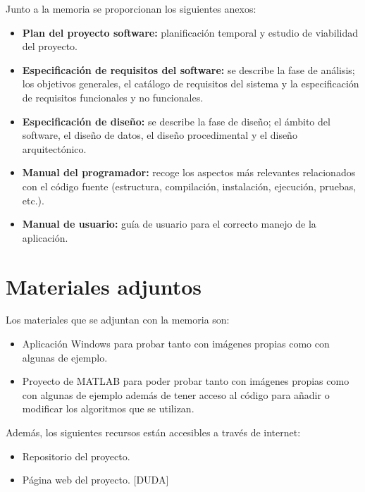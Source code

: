 Junto a la memoria se proporcionan los siguientes anexos:

\begin{itemize}
    \tightlist
        \item
            \textbf{Plan del proyecto software:} planificación temporal y estudio de viabilidad del proyecto.
        \item
            \textbf{Especificación de requisitos del software:} se describe la fase de análisis; los objetivos generales, el catálogo de requisitos del sistema y la especificación de requisitos funcionales y no funcionales.
        \item
            \textbf{Especificación de diseño:} se describe la fase de diseño; el ámbito del software, el diseño de datos, el diseño procedimental y el diseño arquitectónico.
        \item
            \textbf{Manual del programador:} recoge los aspectos más relevantes relacionados con el código fuente (estructura, compilación, instalación, ejecución, pruebas, etc.).
        \item
            \textbf{Manual de usuario:} guía de usuario para el correcto manejo de la aplicación.
\end{itemize}

\section{Materiales adjuntos}\label{materiales-adjuntos}

Los materiales que se adjuntan con la memoria son: 

\begin{itemize}
    \tightlist
        \item
            Aplicación Windows para probar tanto con imágenes propias como con algunas de ejemplo.
        \item
            Proyecto de MATLAB para poder probar tanto con imágenes propias como con algunas de ejemplo además de tener acceso al código para añadir o modificar los algoritmos que se utilizan.
\end{itemize}

Además, los siguientes recursos están accesibles a través de internet:

\begin{itemize}
    \tightlist
        \item
            Repositorio del proyecto.
        \item
            Página web del proyecto. [DUDA]
\end{itemize}
